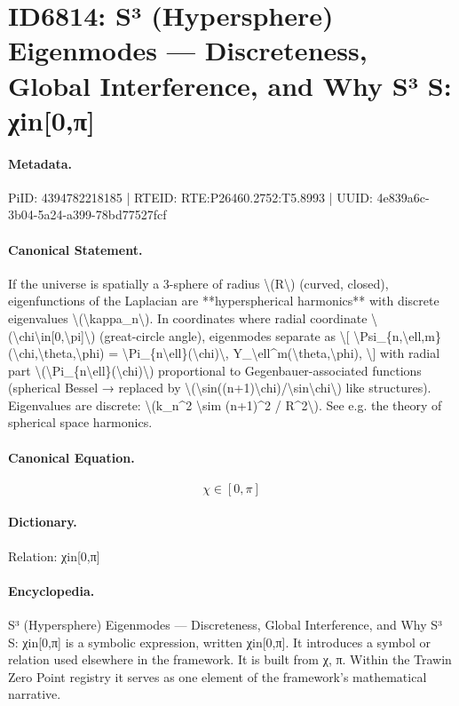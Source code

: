 \section*{ID6814: S³ (Hypersphere) Eigenmodes — Discreteness, Global Interference, and Why S³ S: χin[0,π]}
\paragraph{Metadata.}
PiID: 4394782218185 | RTEID: RTE:P26460.2752:T5.8993 | UUID: 4e839a6c-3b04-5a24-a399-78bd77527fcf

\paragraph{Canonical Statement.}
If the universe is spatially a 3-sphere of radius \textbackslash{}(R\textbackslash{}) (curved, closed), eigenfunctions of the Laplacian are **hyperspherical harmonics** with discrete eigenvalues \textbackslash{}(\textbackslash{}kappa\_n\textbackslash{}). In coordinates where radial coordinate \textbackslash{}(\textbackslash{}chi\textbackslash{}in[0,\textbackslash{}pi]\textbackslash{}) (great-circle angle), eigenmodes separate as \textbackslash{}[ \textbackslash{}Psi\_\{n,\textbackslash{}ell,m\}(\textbackslash{}chi,\textbackslash{}theta,\textbackslash{}phi) = \textbackslash{}Pi\_\{n\textbackslash{}ell\}(\textbackslash{}chi)\textbackslash{}, Y\_\textbackslash{}ell\textasciicircum{}m(\textbackslash{}theta,\textbackslash{}phi), \textbackslash{}] with radial part \textbackslash{}(\textbackslash{}Pi\_\{n\textbackslash{}ell\}(\textbackslash{}chi)\textbackslash{}) proportional to Gegenbauer-associated functions (spherical Bessel → replaced by \textbackslash{}(\textbackslash{}sin((n+1)\textbackslash{}chi)/\textbackslash{}sin\textbackslash{}chi\textbackslash{}) like structures). Eigenvalues are discrete: \textbackslash{}(k\_n\textasciicircum{}2 \textbackslash{}sim (n+1)\textasciicircum{}2 / R\textasciicircum{}2\textbackslash{}). See e.g. the theory of spherical space harmonics.

\paragraph{Canonical Equation.}
\[
\chi\in[0,\pi]
\]

\paragraph{Dictionary.}
Relation: χin[0,π]

\paragraph{Encyclopedia.}
S³ (Hypersphere) Eigenmodes — Discreteness, Global Interference, and Why S³ S: χin[0,π] is a symbolic expression, written χin[0,π]. It introduces a symbol or relation used elsewhere in the framework. It is built from χ, π. Within the Trawin Zero Point registry it serves as one element of the framework's mathematical narrative.
